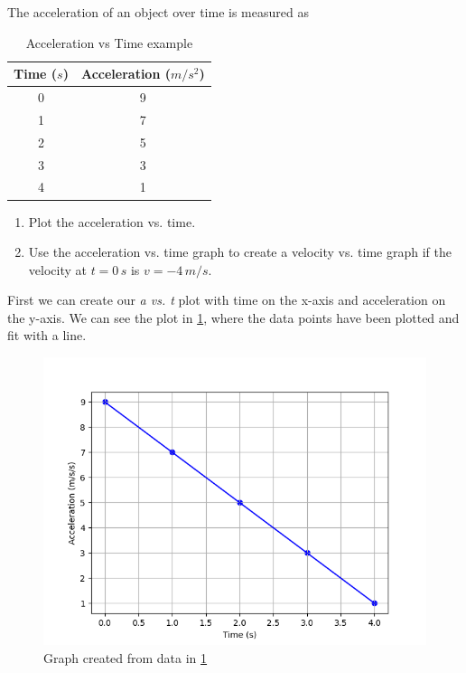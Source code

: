 \documentclass[12pt]{book}
\begin{document}
\begin{exampleblock}

The acceleration of an object over time is measured as

\begin{table}[h]
\large
\centering
\caption{Acceleration vs Time example}
\begin{tabular}{| c | c |}
	\hline
	Time ($s$) & Acceleration ($m/s^2$) \\
	\hline
	0 & 9 \\ \hline
	1 & 7 \\ \hline
	2 & 5 \\ \hline
	3 & 3 \\ \hline
	4 & 1 \\ 
	\hline
\end{tabular}
\label{atable_ex1}
\end{table}

\begin{enumerate}
\item Plot the acceleration vs. time.
\item Use the acceleration vs. time graph to create a velocity vs. time graph if the velocity at $t = 0 \, s$ is $v = -4 \, m/s$.
\end{enumerate}

First we can create our \textit{a vs. t} plot with time on the x-axis and acceleration on the y-axis. We can see the plot in \ref{atable_motiongraph_ex1}, where the data points have been plotted and fit with a line.

\begin{figure}[h]
\centering
\includegraphics[scale=0.6]{example_accel.png}
\caption{Graph created from data in \ref{atable_ex1}}
\label{atable_motiongraph_ex1}
\end{figure}


\end{exampleblock}
\end{document}
